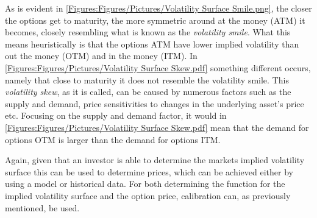 
As is evident in \autoref{Figures:Figures/Pictures/Volatility Surface Smile.png}, the closer the options get to maturity, the more symmetric around at the money (ATM) it becomes, closely resembling what is known as the \emph{volatility smile}. What this means heuristically is that the options ATM have lower implied volatility than out the money (OTM) and in the money (ITM). In \autoref{Figures:Figures/Pictures/Volatility Surface Skew.pdf} something different occurs, namely that close to maturity it does not resemble the volatility smile. This \emph{volatility skew}, as it is called, can be caused by numerous factors such as the supply and demand, price sensitivities to changes in the underlying asset's price etc. Focusing on the supply and demand factor, it would in \autoref{Figures:Figures/Pictures/Volatility Surface Skew.pdf} mean that the demand for options OTM is larger than the demand for options ITM.

Again, given that an investor is able to determine the markets implied volatility surface this can be used to determine prices, which can be achieved either by using a model or historical data. For both determining the function for the implied volatility surface and the option price, calibration can, as previously mentioned, be used.


